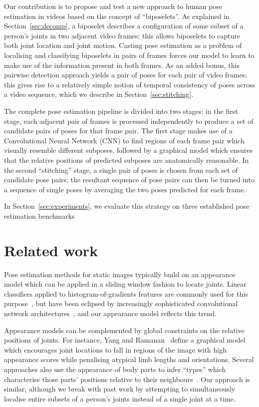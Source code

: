 \documentclass[runningheads]{llncs}
\begin{document}
Our contribution is to propose and test a new approach to human pose estimation
in videos based on the concept of ``biposelets''. As explained in
Section~\ref{sec:decomp}, a biposelet describes a configuration of some subset
of a person's joints in two adjacent video frames; this allows biposelets to
capture both joint location and joint motion. Casting pose estimation as a
problem of localising and classifying biposelets in pairs of frames forces our
model to learn to make use of the information present in both frames.
As an added bonus, this pairwise detection approach yields a pair of poses for
each pair of video frames; this gives rise to a relatively simple notion of
temporal consistency of poses across a video sequence, which we describe in
Section~\ref{sec:stitching}.

The complete pose estimation pipeline is divided into two stages: in the first
stage, each adjacent pair of frames is processed independently to produce a set
of candidate pairs of poses for that frame pair. The first stage makes use of a
Convolutional Neural Network (CNN) to find regions of each frame pair which
visually resemble different subposes, followed by a graphical model which
ensures that the relative positions of predicted subposes are anatomically
reasonable. In the second ``stitching'' stage, a single pair of poses is chosen
from each set of candidate pose pairs; the resultant sequence of pose pairs can
then be turned into a sequence of single poses by averaging the two poses
predicted for each frame.

In Section~\ref{sec:experiments}, we evaluate this strategy on three
established pose estimation benchmarks %

\section{Related work}\label{sec:related-work}

Pose estimation methods for static images typically build on an appearance model
which can be applied in a sliding window fashion to locate joints. Linear
classifiers applied to histogram-of-gradients features are commonly used for
this purpose~\cite{yang2011articulated,cherian2014mixing}, but have been
eclipsed by increasingly sophisticated convolutional network
architectures~\cite{jain2014modeep,tompson2014joint,chen2014articulated,pfister2015flowing,wei2016convolutional},
and our appearance model reflects this trend.

Appearance models can be complemented by global constraints on the relative
positions of joints. For instance, Yang and Ramanan~\cite{yang2011articulated}
define a graphical model which encourages joint locations to fall in regions of
the image with high appearance scores while penalising atypical limb lengths and
orientations. Several approaches also use the appearance of body parts to infer
``types'' which characterise those parts' positions relative to their
neighbours~\cite{yang2011articulated,chen2014articulated}. Our approach is
similar, although we break with past work by attempting to simultaneously
localise entire subsets of a person's joints instead of a single joint at a
time.
\end{document}
